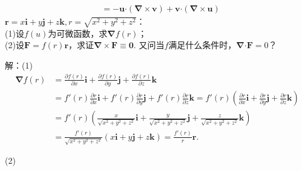 \documentclass[12pt,UTF8,fleqn]{ctexart}
\newcommand{\pp}[2]{\frac{\partial #1}{\partial #2}}
\begin{document}
\begin{enumerate}
\[\begin{split}
&=-\bm u\bm\cdot(\bm\nabla\times\bm v)+\bm v\bm\cdot(\bm\nabla\times\bm u)
\end{split}\]
$\bm r=x\bm i+y\bm j+z\bm k,r=\sqrt{x^2+y^2+z^2}$：\\
(1)设$f(u)$为可微函数，求$\bm\nabla f(r)$；\\
(2)设$\bm F=f(r)\bm r$，求证$\bm\nabla\times\bm F\equiv\bm0$. 又问当$f$满足什么条件时，$\bm\nabla\bm\cdot\bm F=0$？

解：(1)\[\begin{split}
\bm\nabla f(r)&=\pp{f(r)}x\bm i+\pp{f(r)}y\bm j+\pp{f(r)}z\bm k\\
&=f'(r)\pp rx\bm i+f'(r)\pp ry\bm j+f'(r)\pp rz\bm k=f'(r)(\pp rx\bm i+\pp ry\bm j+\pp rz\bm k)\\
&=f'(r)(\frac x{\sqrt{x^2+y^2+z^2}}\bm i+\frac y{\sqrt{x^2+y^2+z^2}}\bm j+\frac z{\sqrt{x^2+y^2+z^2}}\bm k)\\
&=\frac{f'(r)}{\sqrt{x^2+y^2+z^2}}(x\bm i+y\bm j+z\bm k)=\frac{f'(r)}r\bm r.
\end{split}\]

(2)


\end{enumerate}
\end{document}
